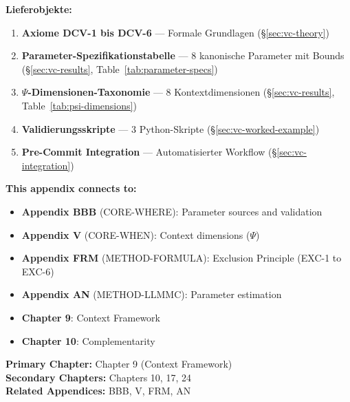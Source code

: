 \begin{tcolorbox}[colback=purple!5!white, colframe=purple!75!black, title=Appendix Scope:]
\vspace{0.3em}
\textbf{Lieferobjekte:}
\begin{enumerate}[label=\textbf{L\arabic*}:, leftmargin=2cm]
    \item \textbf{Axiome DCV-1 bis DCV-6} --- Formale Grundlagen (\S\ref{sec:vc-theory})
    \item \textbf{Parameter-Spezifikationstabelle} --- 8 kanonische Parameter mit Bounds (\S\ref{sec:vc-results}, Table~\ref{tab:parameter-specs})
    \item \textbf{$\Psi$-Dimensionen-Taxonomie} --- 8 Kontextdimensionen (\S\ref{sec:vc-results}, Table~\ref{tab:psi-dimensions})
    \item \textbf{Validierungsskripte} --- 3 Python-Skripte (\S\ref{sec:vc-worked-example})
    \item \textbf{Pre-Commit Integration} --- Automatisierter Workflow (\S\ref{sec:vc-integration})
\end{enumerate}

\end{tcolorbox}

\begin{tcolorbox}[colback=blue!5!white, colframe=blue!75!black, title=Cross-Reference Map]
\textbf{This appendix connects to:}
\begin{itemize}
    \item \textbf{Appendix BBB} (CORE-WHERE): Parameter sources and validation
    \item \textbf{Appendix V} (CORE-WHEN): Context dimensions ($\Psi$)
    \item \textbf{Appendix FRM} (METHOD-FORMULA): Exclusion Principle (EXC-1 to EXC-6)
    \item \textbf{Appendix AN} (METHOD-LLMMC): Parameter estimation
    \item \textbf{Chapter 9}: Context Framework
    \item \textbf{Chapter 10}: Complementarity
\end{itemize}
\end{tcolorbox}

\begin{tcolorbox}[colback=green!5!white, colframe=green!75!black, title=Chapter Linkage]
\textbf{Primary Chapter:} Chapter 9 (Context Framework) \\
\textbf{Secondary Chapters:} Chapters 10, 17, 24 \\
\textbf{Related Appendices:} BBB, V, FRM, AN
\end{tcolorbox}

